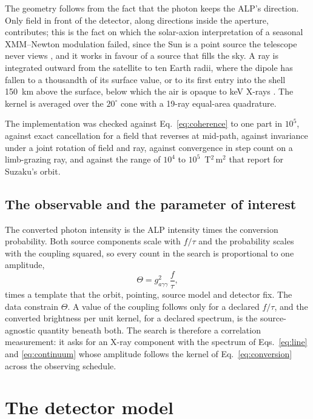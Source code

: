 \documentclass[11pt]{article}
\newcommand{\Th}{\Theta}
\newcommand{\gag}{g_{a\gamma\gamma}}
\begin{document}
The geometry follows from the fact that the photon keeps the ALP's direction. Only field in front of the detector, along directions inside the aperture, contributes; this is the fact on which the solar-axion interpretation of a seasonal XMM--Newton modulation failed, since the Sun is a point source the telescope never views \citep{fraser2014xmm,roncadelli2015nosolar}, and it works in favour of a source that fills the sky. A ray is integrated outward from the satellite to ten Earth radii, where the dipole has fallen to a thousandth of its surface value, or to its first entry into the shell 150~km above the surface, below which the air is opaque to keV X-rays \citep{davoudiasl2006geomagnetic}. The kernel is averaged over the $20^\circ$ cone with a 19-ray equal-area quadrature.

The implementation was checked against Eq.~\eqref{eq:coherence} to one part in $10^{5}$, against exact cancellation for a field that reverses at mid-path, against invariance under a joint rotation of field and ray, against convergence in step count on a limb-grazing ray, and against the range of $10^{4}$ to $10^{5}$~T$^2$\,m$^2$ that \citet{yamamoto2020alp} report for Suzaku's orbit.

\subsection{The observable and the parameter of interest}

The converted photon intensity is the ALP intensity times the conversion probability. Both source components scale with $f/\tau$ and the probability scales with the coupling squared, so every count in the search is proportional to one amplitude,
\begin{equation}
\Th=\gag^{2}\,\frac{f}{\tau},
\label{eq:theta}
\end{equation}
times a template that the orbit, pointing, source model and detector fix. The data constrain $\Th$. A value of the coupling follows only for a declared $f/\tau$, and the converted brightness per unit kernel, for a declared spectrum, is the source-agnostic quantity beneath both. The search is therefore a correlation measurement: it asks for an X-ray component with the spectrum of Eqs.~\eqref{eq:line} and \eqref{eq:continuum} whose amplitude follows the kernel of Eq.~\eqref{eq:conversion} across the observing schedule.

\section{The detector model}
\label{sec:detector}
\end{document}

